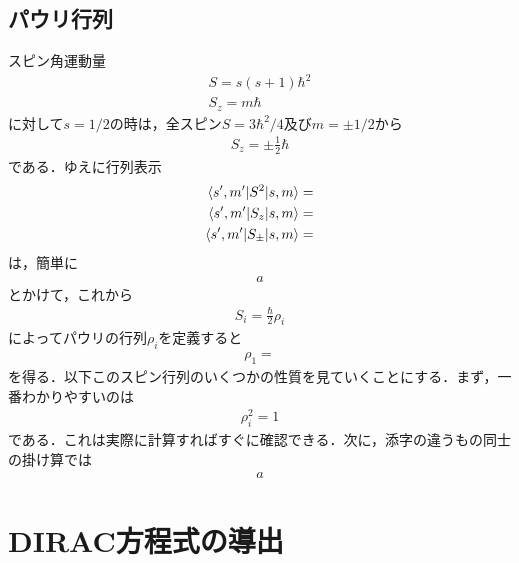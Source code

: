 \documentclass[a4j]{jarticle}
\begin{document}
\subsection{パウリ行列}
  スピン角運動量
\begin{align*}
 S=s(s+1)\hbar^2\\
 S_z=m\hbar
\end{align*}
に対して$s=1/2$の時は，全スピン$S=3\hbar^2/4 $及び$m=\pm 1/2$から
\begin{align*}
 S_z=\pm\frac{1}{2}\hbar
\end{align*}
である．ゆえに行列表示
\begin{align*}
 \braket{s',m'|S^2|s,m}=\\
 \braket{s',m'|S_z|s,m}=\\
 \braket{s',m'|S_{\pm}|s,m}=
\end{align*}
は，簡単に
\begin{align*}
 a
\end{align*}
とかけて，これから
\begin{align*}
 S_i=\frac{\hbar}{2}\rho_i
\end{align*}
によってパウリの行列$\rho_i$を定義すると
\begin{align*}
 \rho_1=
\end{align*}
を得る．以下このスピン行列のいくつかの性質を見ていくことにする．まず，一番わかりやすいのは
\begin{align*}
 \rho_i^2=1
\end{align*}
である．これは実際に計算すればすぐに確認できる．次に，添字の違うもの同士の掛け算では
\begin{align*}
 a
\end{align*}


\section{DIRAC方程式の導出}
\end{document}
